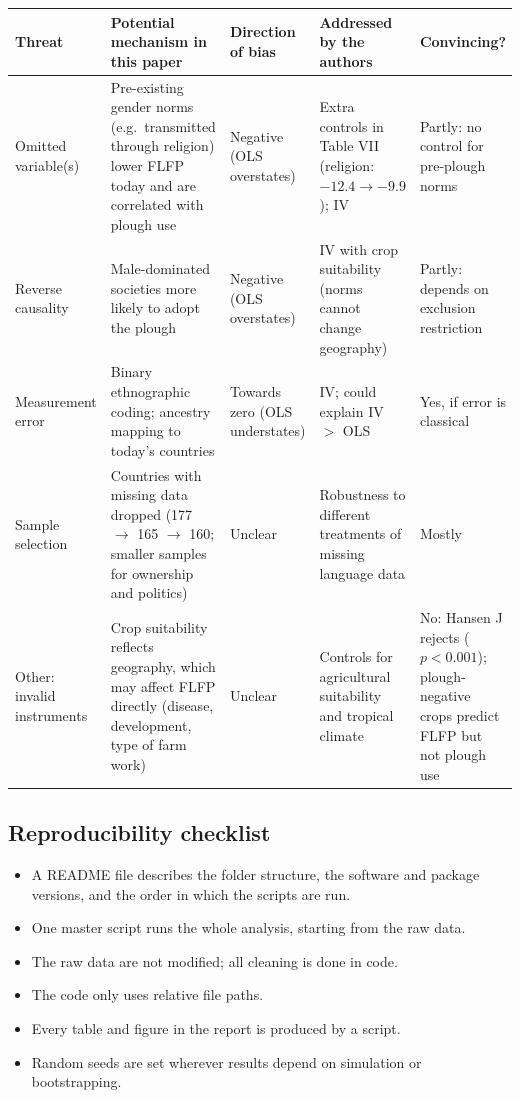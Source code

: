 \documentclass[12pt,a4paper]{article}
\renewcommand{\arraystretch}{1.25}
\begin{document}
{\renewcommand{\arraystretch}{1.4}%
\begin{tabularx}{\textwidth}{@{}>{\raggedright\arraybackslash}p{}
  L
  >{\raggedright\arraybackslash}p{0.13\textwidth}
  L
  >{\raggedright\arraybackslash}p{0.14\textwidth}@{}}
\toprule
Threat & Potential mechanism in this paper & Direction of bias & Addressed by the authors & Convincing? \\
\midrule
Omitted variable(s) & Pre-existing gender norms (e.g.\ transmitted through religion) lower FLFP today and are correlated with plough use & Negative (OLS overstates) & Extra controls in Table VII (religion: $-12.4 \to -9.9$); IV & Partly: no control for pre-plough norms \\
Reverse causality & Male-dominated societies more likely to adopt the plough & Negative (OLS overstates) & IV with crop suitability (norms cannot change geography) & Partly: depends on exclusion restriction \\
Measurement error & Binary ethnographic coding; ancestry mapping to today's countries & Towards zero (OLS understates) & IV; could explain IV $>$ OLS & Yes, if error is classical \\
Sample selection & Countries with missing data dropped (177 $\to$ 165 $\to$ 160; smaller samples for ownership and politics) & Unclear & Robustness to different treatments of missing language data & Mostly \\
Other: invalid instruments & Crop suitability reflects geography, which may affect FLFP directly (disease, development, type of farm work) & Unclear & Controls for agricultural suitability and tropical climate & No: Hansen J rejects ($p < 0.001$); plough-negative crops predict FLFP but not plough use \\
\bottomrule
\end{tabularx}}

\subsection{Reproducibility checklist}

\begin{itemize}[label=$\square$, leftmargin=*, itemsep=2pt]
  \item A README file describes the folder structure, the software and package versions, and the order in which the scripts are run.
  \item One master script runs the whole analysis, starting from the raw data.
  \item The raw data are not modified; all cleaning is done in code.
  \item The code only uses relative file paths.
  \item Every table and figure in the report is produced by a script.
  \item Random seeds are set wherever results depend on simulation or bootstrapping.
\end{itemize}
\end{document}
